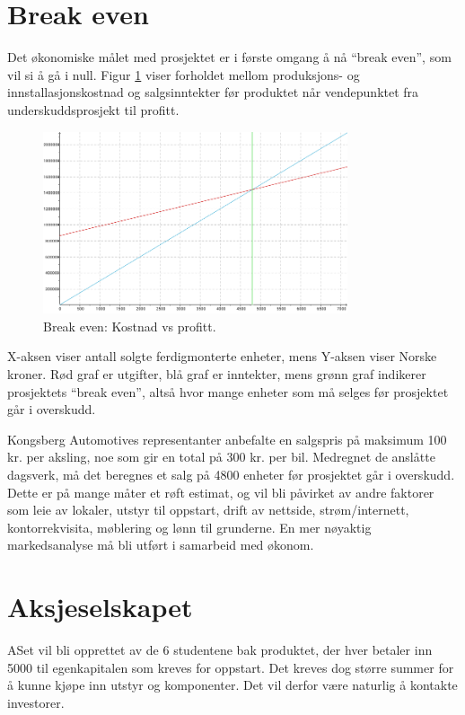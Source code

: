 \section{Break even}
Det økonomiske målet med prosjektet er i første omgang å nå ``break even'', 
som vil si å gå i null. Figur \ref{fig:breakeven} viser forholdet mellom 
produksjons- og innstallasjonskostnad og salgsinntekter før produktet når 
vendepunktet fra underskuddsprosjekt til profitt. 
	\newline
	\begin{figure}[H]
		\centering
		\includegraphics[width=0.80\textwidth]{images/break-even.png}
		\caption{Break even: Kostnad vs profitt.}
		\label{fig:breakeven}
	\end{figure}
X-aksen viser antall solgte ferdigmonterte enheter, mens Y-aksen viser 
Norske kroner. Rød graf er utgifter, blå graf er inntekter, mens grønn graf 
indikerer prosjektets ``break even'', altså hvor mange enheter som må selges 
før prosjektet går i overskudd.

Kongsberg Automotives representanter anbefalte en salgspris på maksimum 100 kr.
per aksling, noe som gir en total på 300 kr. per bil. Medregnet de anslåtte 
dagsverk, må det beregnes et salg på 4800 enheter før prosjektet går i overskudd. Dette 
er på mange måter et røft estimat, og vil bli påvirket av andre faktorer som leie av lokaler, 
utstyr til oppstart, drift av nettside, strøm/internett, kontorrekvisita, møblering og lønn til 
grunderne. En mer nøyaktig markedsanalyse må bli utført i samarbeid med økonom.

\section{Aksjeselskapet}
ASet vil bli opprettet av de 6 studentene bak produktet, der hver betaler inn 5000 til egenkapitalen som kreves for oppstart. 
Det kreves dog større summer for å kunne kjøpe inn utstyr og komponenter. Det vil derfor være naturlig å kontakte investorer.

